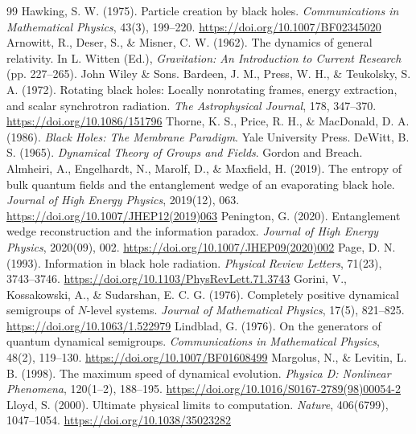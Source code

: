 \documentclass[11pt,a4paper]{article}
\begin{document}
\begin{thebibliography}{99}
 Hawking, S. W. (1975). Particle creation by black holes. \emph{Communications in Mathematical Physics}, 43(3), 199--220. \url{https://doi.org/10.1007/BF02345020}
 Arnowitt, R., Deser, S., \& Misner, C. W. (1962). The dynamics of general relativity. In L. Witten (Ed.), \emph{Gravitation: An Introduction to Current Research} (pp. 227--265). John Wiley \& Sons.
 Bardeen, J. M., Press, W. H., \& Teukolsky, S. A. (1972). Rotating black holes: Locally nonrotating frames, energy extraction, and scalar synchrotron radiation. \emph{The Astrophysical Journal}, 178, 347--370. \url{https://doi.org/10.1086/151796}
 Thorne, K. S., Price, R. H., \& MacDonald, D. A. (1986). \emph{Black Holes: The Membrane Paradigm}. Yale University Press.
 DeWitt, B. S. (1965). \emph{Dynamical Theory of Groups and Fields}. Gordon and Breach.
 Almheiri, A., Engelhardt, N., Marolf, D., \& Maxfield, H. (2019). The entropy of bulk quantum fields and the entanglement wedge of an evaporating black hole. \emph{Journal of High Energy Physics}, 2019(12), 063. \url{https://doi.org/10.1007/JHEP12(2019)063}
 Penington, G. (2020). Entanglement wedge reconstruction and the information paradox. \emph{Journal of High Energy Physics}, 2020(09), 002. \url{https://doi.org/10.1007/JHEP09(2020)002}
 Page, D. N. (1993). Information in black hole radiation. \emph{Physical Review Letters}, 71(23), 3743--3746. \url{https://doi.org/10.1103/PhysRevLett.71.3743}
 Gorini, V., Kossakowski, A., \& Sudarshan, E. C. G. (1976). Completely positive dynamical semigroups of $N$-level systems. \emph{Journal of Mathematical Physics}, 17(5), 821--825. \url{https://doi.org/10.1063/1.522979}
 Lindblad, G. (1976). On the generators of quantum dynamical semigroups. \emph{Communications in Mathematical Physics}, 48(2), 119--130. \url{https://doi.org/10.1007/BF01608499}
 Margolus, N., \& Levitin, L. B. (1998). The maximum speed of dynamical evolution. \emph{Physica D: Nonlinear Phenomena}, 120(1--2), 188--195. \url{https://doi.org/10.1016/S0167-2789(98)00054-2}
 Lloyd, S. (2000). Ultimate physical limits to computation. \emph{Nature}, 406(6799), 1047--1054. \url{https://doi.org/10.1038/35023282}
\end{thebibliography}
\end{document}
